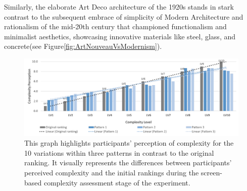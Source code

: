 Similarly, the elaborate Art Deco architecture of the 1920s stands in stark contrast to the subsequent embrace of simplicity of Modern Architecture and rationalism  of the mid-20th century that championed functionalism and minimalist aesthetics, showcasing innovative materials like steel, glass, and concrete\cite{Stacbond2020}(see Figure\ref{fig:ArtNouveauVsModernism}).





    \begin{figure}[htb]
      \centering
      \includegraphics[width= \linewidth, trim=0 0 0 0]{Images/ComplexityPerceptionPerLevel}
      \caption{This graph highlights participants' perception of complexity for the 10 variations within three patterns in contrast to the original ranking. It visually represents the differences between participants' perceived complexity and the initial rankings during the screen-based complexity assessment stage of the experiment.}
      \label{fig:ComplexityPerceptionPerLevel2}
    \end{figure}

